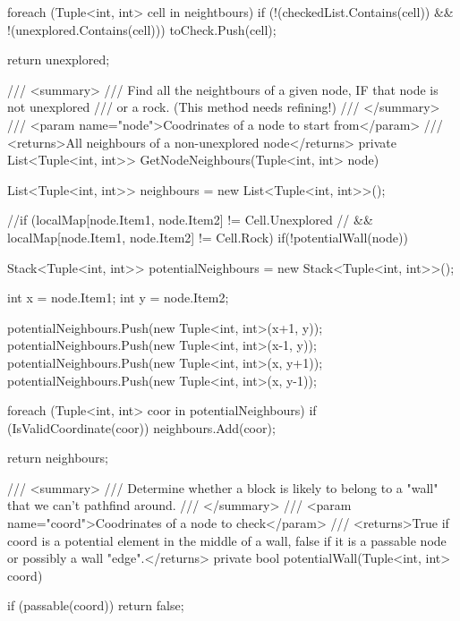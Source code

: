 \documentclass[11pt]{article}
\begin{document}
\begin{code}
{{{{                foreach (Tuple<int, int> cell in neightbours)
                {
                    if (!(checkedList.Contains(cell))
                        && !(unexplored.Contains(cell)))
                    {
                        toCheck.Push(cell);
                    }
                }
            }

            return unexplored;
        }

        /// <summary>
        /// Find all the neightbours of a given node, IF that node is not unexplored
        /// or a rock. (This method needs refining!)
        /// </summary>
        /// <param name="node">Coodrinates of a node to start from</param>
        /// <returns>All neighbours of a non-unexplored node</returns>
        private List<Tuple<int, int>> GetNodeNeighbours(Tuple<int, int> node)
        {
            List<Tuple<int, int>> neighbours = new List<Tuple<int, int>>();

            //if (localMap[node.Item1, node.Item2] != Cell.Unexplored
            // && localMap[node.Item1, node.Item2] != Cell.Rock)
            if(!potentialWall(node))
            {
                Stack<Tuple<int, int>> potentialNeighbours
                    = new Stack<Tuple<int, int>>();

                int x = node.Item1;
                int y = node.Item2;

                potentialNeighbours.Push(new Tuple<int, int>(x+1, y));
                potentialNeighbours.Push(new Tuple<int, int>(x-1, y));
                potentialNeighbours.Push(new Tuple<int, int>(x, y+1));
                potentialNeighbours.Push(new Tuple<int, int>(x, y-1));

                foreach (Tuple<int, int> coor in potentialNeighbours)
                {
                    if (IsValidCoordinate(coor))
                    {
                        neighbours.Add(coor);
                    }
                }
            }

            return neighbours;
        }

        /// <summary>
        /// Determine whether a block is likely to belong to a "wall" that we can't pathfind around.
        /// </summary>
        /// <param name="coord">Coodrinates of a node to check</param>
        /// <returns>True if coord is a potential element in the middle of a wall, false if it is a passable node or possibly a wall "edge".</returns>
        private bool potentialWall(Tuple<int, int> coord)
        {
            if (passable(coord))
            {
                return false;
            }

}}}
\end{code}
\end{document}
